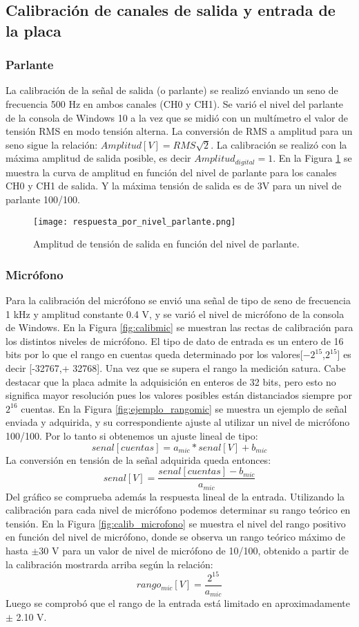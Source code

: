 \documentclass[a4paper, 11pt]{article}
\begin{document}
\subsection*{Calibración de canales de salida y entrada de la placa}
\subsubsection*{Parlante}
La calibración de la señal de salida (o parlante) se realizó enviando un seno de frecuencia 500 Hz en ambos canales (CH0 y CH1). Se varió el nivel del parlante de la consola de Windows 10 a la vez que se midió con un multímetro el valor de tensión RMS en modo tensión alterna. La conversión de RMS a amplitud para un seno sigue la relación:
$Amplitud[V]={RMS}{\sqrt2}$.
La calibración se realizó con la máxima amplitud de salida posible, es decir $Amplitud_{digital}=1$. En la Figura \ref{fig:calib_parlante} se muestra la curva de amplitud en función del nivel de parlante para los canales CH0 y CH1 de salida. Y la máxima tensión de salida es de 3V para un nivel de parlante 100/100.

\begin{figure} [H]
\centering
\texttt{[image: respuesta\_por\_nivel\_parlante.png]}
\caption{Amplitud de tensión de salida en función del nivel de parlante.\label{fig:calib_parlante}}
\end{figure} 

\subsubsection*{Micrófono}
Para la calibración del micrófono se envió una señal de tipo de seno de frecuencia 1 kHz y amplitud constante 0.4 V, y se varió el nivel de micrófono de la consola de Windows. En la Figura \ref{fig:calibmic} se muestran las rectas de calibración para los distintos niveles de micrófono. El tipo de dato de entrada es un entero de 16 bits por lo que el rango en cuentas queda determinado por los valores[$-2^{15}$,$2^{15}$] es decir [-32767,+ 32768]. Una vez que se supera el rango la medición satura. Cabe destacar que la placa admite la adquisición en enteros de 32 bits, pero esto no significa mayor resolución pues los valores posibles están distanciados siempre por $2^{16}$  cuentas.
En la Figura \ref{fig:ejemplo_rangomic} se muestra un ejemplo de señal enviada y adquirida, y su correspondiente ajuste al utilizar un nivel de micrófono 100/100. Por lo tanto si obtenemos un ajuste lineal de tipo:
\[
senal[cuentas]=a_{mic}*senal [V]+b_{mic}
\]
La conversión en tensión de la señal adquirida queda entonces:
\[
senal [V]=\frac{senal[cuentas]-b_{mic}}{a_{mic}}
\]
Del gráfico se comprueba además la respuesta lineal de la entrada.
Utilizando la calibración para cada nivel de micrófono podemos determinar su rango teórico en tensión. En la Figura \ref{fig:calib_microfono} se muestra el nivel del rango positivo en función del nivel de micrófono, donde se observa un rango teórico máximo de hasta $\pm$30 V para un valor de nivel de micrófono de 10/100, obtenido a partir de la calibración mostrarda arriba según la relación: 
\[
rango_{mic} [V]=\frac{2^{15}}{a_{mic}}
\]
Luego se comprobó que el rango de la entrada está limitado en aproximadamente $\pm$ 2.10 V.
\end{document}
